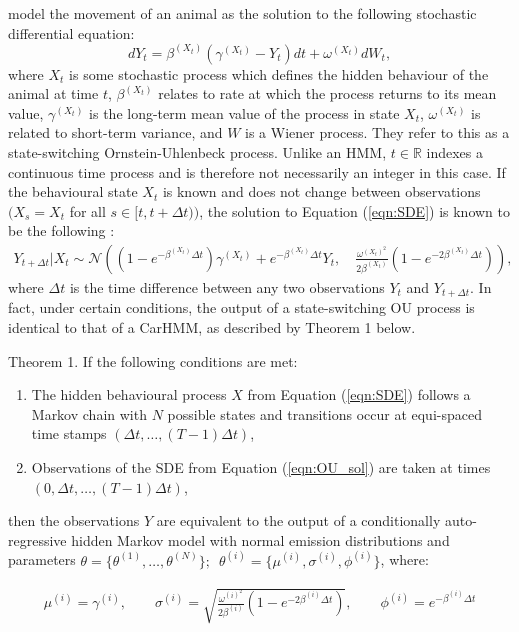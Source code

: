 \citet{Michelot:2019} model the movement of an animal as the solution to the following stochastic differential equation:
%
\begin{equation}
    \label{eqn:SDE}
    dY_t = \beta^{(X_t)}(\gamma^{(X_t)} - Y_t)dt + \omega^{(X_t)} dW_t,
\end{equation}
%
where $X_t$ is some stochastic process which defines the hidden behaviour of the animal at time $t$, $\beta^{(X_t)}$ relates to rate at which the process returns to its mean value, $\gamma^{(X_t)}$ is the long-term mean value of the process in state $X_t$, $\omega^{(X_t)}$ is related to short-term variance, and $W$ is a Wiener process. They refer to this as a state-switching Ornstein-Uhlenbeck process. Unlike an HMM, $t \in \mathbb{R}$ indexes a continuous time process and is therefore not necessarily an integer in this case. If the behavioural state $X_t$ is known and does not change between observations $\Big(X_s = X_t$ for all $s \in [t,t+\Delta t)\Big)$, the solution to Equation (\ref{eqn:SDE}) is known to be the following \citep{Michelot:2019}:
%
\begin{align}
    Y_{t+\Delta t} | X_{t} \sim \mathcal{N}\left((1-e^{-\beta^{(X_t)}\Delta t})\gamma^{(X_t)} + e^{-\beta^{(X_t)}\Delta t} Y_t,\quad \frac{\omega^{(X_t)^2}}{2\beta^{(X_t)}} (1-e^{-2\beta^{(X_t)}\Delta t})\right),
    \label{eqn:OU_sol}
\end{align}
%
where $\Delta t$ is the time difference between any two observations $Y_t$ and $Y_{t+\Delta t}$. In fact, under certain conditions, the output of a state-switching OU process is identical to that of a CarHMM, as described by Theorem 1 below.

\begin{theorem}{Theorem 1.}{}%
If the following conditions are met:
\begin{enumerate}
    \item The hidden behavioural process $X$ from Equation (\ref{eqn:SDE}) follows a Markov chain with $N$ possible states and transitions occur at equi-spaced time stamps $\left(\Delta t, \ldots, (T-1)\Delta t\right)$,
    
    \item Observations of the SDE from Equation (\ref{eqn:OU_sol}) are taken at times $\left(0, \Delta t, \ldots, (T-1)\Delta t\right)$,
\end{enumerate}
then the observations $Y$ are equivalent to the output of a conditionally auto-regressive hidden Markov model with normal emission distributions and parameters $\theta = \{\theta^{(1)}, \ldots, \theta^{(N)}\}; \enspace \theta^{(i)} = \{\mu^{(i)},\sigma^{(i)},\phi^{(i)}\}$, where:

\begin{align}
\mu^{(i)} = \gamma^{(i)}, \qquad \sigma^{(i)} = \sqrt{\frac{\omega^{(i)^2}}{2\beta^{(i)}} (1-e^{-2\beta^{(i)}\Delta t})}, \qquad \phi^{(i)} = e^{-\beta^{(i)}\Delta t} \label{eqn:CarHMM_to_OU}
\end{align}

\end{theorem}

